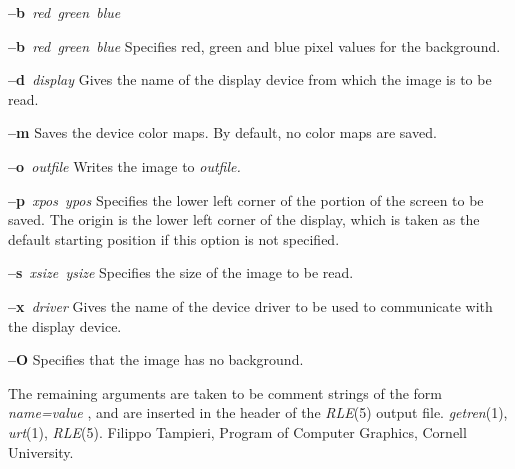 \begin{TPlist}{{\bf --b}{\it \ red\ green\ blue}
}
\item[{{\bf --b}{\it \ red\ green\ blue}
}]
Specifies red, green and blue pixel values for the background.
\item[{{\bf --d}{\it \ display}
}]
Gives the name of the display device from which the image is to be read.
\item[{{\bf --m}
}]
Saves the device color maps. By default, no color maps are saved.
\item[{{\bf --o}{\it \ outfile}
}]
Writes the image to
{\it outfile.}
\item[{{\bf --p}{\it \ xpos\ ypos}
}]
Specifies the lower left corner of the portion of the screen to be
saved. The origin is the lower left corner of the display, which is
taken as the default starting position if this option is not specified.
\item[{{\bf --s}{\it \ xsize\ ysize}
}]
Specifies the size of the image to be read.
\item[{{\bf --x}{\it \ driver}
}]
Gives the name of the device driver to be used to communicate with
the display device.
\item[{{\bf --O}
}]
Specifies that the image has no background.
\end{TPlist}\par\noindent
The remaining arguments are taken to be comment strings of the form
{\it name=value}
, and are inserted in the header of the
{\it RLE}{\rm (5)}
output file.
{\it getren}{\rm (1),}
{\it urt}{\rm (1),}
{\it RLE}{\rm (5).}
Filippo Tampieri, Program of Computer Graphics, Cornell University.


\newpage


